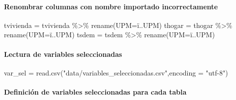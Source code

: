\documentclass[
]{article}
\newenvironment{Shaded}{\begin{snugshade}}{\end{snugshade}}
\newcommand{\AttributeTok}[1]{\textcolor[rgb]{0.77,0.63,0.00}{#1}}
\newcommand{\FunctionTok}[1]{\textcolor[rgb]{0.00,0.00,0.00}{#1}}
\newcommand{\NormalTok}[1]{#1}
\newcommand{\OtherTok}[1]{\textcolor[rgb]{0.56,0.35,0.01}{#1}}
\newcommand{\SpecialCharTok}[1]{\textcolor[rgb]{0.00,0.00,0.00}{#1}}
\newcommand{\StringTok}[1]{\textcolor[rgb]{0.31,0.60,0.02}{#1}}
\begin{document}
\hypertarget{renombrar-columnas-con-nombre-importado-incorrectamente}{%
\paragraph{Renombrar columnas con nombre importado
incorrectamente}\label{renombrar-columnas-con-nombre-importado-incorrectamente}}

\begin{Shaded}
\begin{Highlighting}[]
\NormalTok{tvivienda }\OtherTok{=}\NormalTok{ tvivienda }\SpecialCharTok{\%\textgreater{}\%} \FunctionTok{rename}\NormalTok{(}\AttributeTok{UPM=}\NormalTok{ï..UPM)}
\NormalTok{thogar }\OtherTok{=}\NormalTok{ thogar }\SpecialCharTok{\%\textgreater{}\%} \FunctionTok{rename}\NormalTok{(}\AttributeTok{UPM=}\NormalTok{ï..UPM)}
\NormalTok{tsdem }\OtherTok{=}\NormalTok{ tsdem }\SpecialCharTok{\%\textgreater{}\%} \FunctionTok{rename}\NormalTok{(}\AttributeTok{UPM=}\NormalTok{ï..UPM)}
\end{Highlighting}
\end{Shaded}

\hypertarget{lectura-de-variables-seleccionadas}{%
\paragraph{Lectura de variables
seleccionadas}\label{lectura-de-variables-seleccionadas}}

\begin{Shaded}
\begin{Highlighting}[]
\NormalTok{var\_sel }\OtherTok{=} \FunctionTok{read.csv}\NormalTok{(}\StringTok{"data/variables\_seleccionadas.csv"}\NormalTok{,}\AttributeTok{encoding =} \StringTok{"utf{-}8"}\NormalTok{)}
\end{Highlighting}
\end{Shaded}

\hypertarget{definiciuxf3n-de-variables-seleccionadas-para-cada-tabla}{%
\paragraph{Definición de variables seleccionadas para cada
tabla}\label{definiciuxf3n-de-variables-seleccionadas-para-cada-tabla}}
\end{document}
